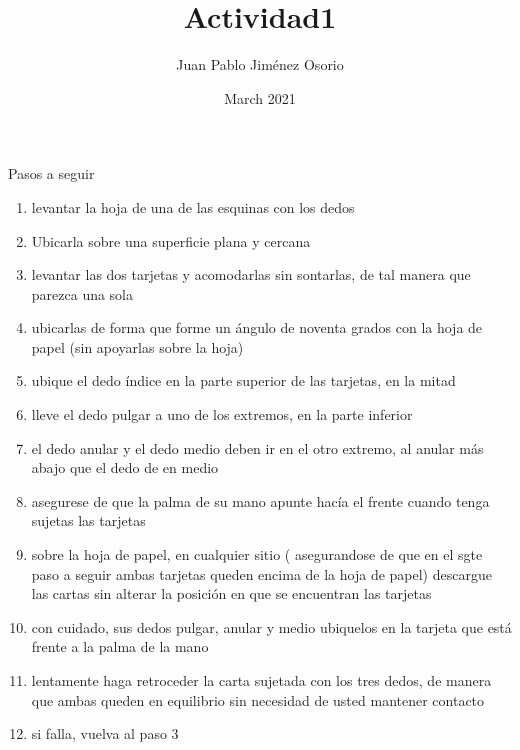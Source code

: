 \documentclass{article}
\begin{document}
\title{Actividad1}

\author{Juan Pablo Jiménez Osorio }
\date{March 2021}
\maketitle



Pasos a seguir
\begin{enumerate}[1]
  
    \item levantar la hoja de una de las esquinas con los dedos
    \item Ubicarla sobre una superficie plana y cercana
    \item levantar las dos tarjetas y acomodarlas sin sontarlas, de tal manera que parezca una sola
    \item ubicarlas de forma que forme un ángulo de noventa grados con la hoja de papel (sin apoyarlas sobre la hoja)
    \item ubique el dedo índice en la parte superior de las tarjetas, en la mitad
    \item lleve el dedo pulgar a uno de los extremos, en la parte inferior
    \item el dedo anular y el dedo medio deben ir en el otro extremo, al anular más abajo que el dedo de en medio
    \item asegurese de que la palma de su mano apunte hacía el frente cuando tenga sujetas las tarjetas
    \item sobre la hoja de papel, en cualquier sitio ( asegurandose de que en el sgte paso a seguir ambas tarjetas queden encima de la hoja de papel) descargue las cartas sin alterar la posición en que se encuentran las tarjetas
    \item con cuidado, sus dedos pulgar, anular y medio ubiquelos en la tarjeta que está frente a la palma de la mano
    \item lentamente haga retroceder la carta sujetada con los tres dedos, de manera que ambas queden en equilibrio sin necesidad de usted mantener contacto
    \item si falla, vuelva al paso 3
    
\end{enumerate}
\end{document}
